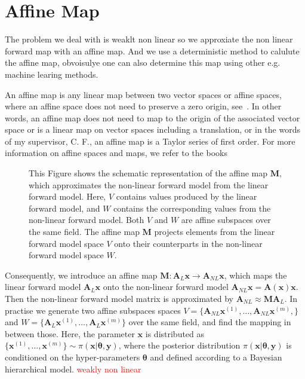 \section{Affine Map}
\label{sec:affine}
The problem we deal with is weaklt non linear so we approxiate the non linear forward map with an affine map.
And we use a deterministic method to calulute the affine map, obvoisulye one can also determine this map using other e.g. machine learing methods.



An affine map is any linear map between two vector spaces or affine spaces, where an affine space does not need to preserve a zero origin, see~\cite[Def. 2.3.1]{berger2009geometry}.
In other words, an affine map does not need to map to the origin of the associated vector space or is a linear map on vector spaces including a translation, or in the words of my supervisor, C. F., an affine map is a Taylor series of first order.
For more information on affine spaces and maps, we refer to the books \cite{berger2009geometry, katsumi1994affine}
\begin{figure}[ht!]
	\centering
	\caption[Schematics of the affine map]{This Figure shows the schematic representation of the affine map $\bm{M}$, which approximates the non-linear forward model from the linear forward model. Here, $V$ contains values produced by the linear forward model, and $W$ contains the corresponding values from the non-linear forward model. Both $V$ and $W$ are affine subspaces over the same field. The affine map $\bm{M}$ projects elements from the linear forward model space $V$ onto their counterparts in the non-linear forward model space $W$.
	}
\end{figure}

Consequently, we introduce an affine map $ \bm{M}:\bm{A}_L \bm{x} \rightarrow \bm{A}_{NL}\bm{x}$, which maps the linear forward model $\bm{A}_L \bm{x}$ onto the non-linear forward model $ \bm{A}_{NL} \bm{x} = \bm{A}(\bm{x})\bm{x} $.
Then the non-linear forward model matrix is approximated by $\bm{A}_{NL} \approx \bm{M} \bm{A}_L$.
In practise we generate two affine subspaces spaces $V = \big\{ \bm{A}_{NL}\bm{x}^{(1)}, \dots ,\bm{A}_{NL}\bm{x}^{(m)}, \big\} $ and $W = \big\{ \bm{A}_L\bm{x}^{(1)}, \dots ,\bm{A}_L\bm{x}^{(m)}\big\}$ over the same field, and find the mapping in between those.
Here, the parameter $\bm{x}$ is distributed as $\big\{  \bm{x}^{(1)} , \dots, \bm{x}^{(m)} \big\} \sim \pi(\bm{x}|\bm{\theta},\bm{y})$, where the posterior distribution $\pi(\bm{x}|\bm{\theta},\bm{y})$ is conditioned on the hyper-parameters $\bm{\theta}$ and defined according to a Bayesian hierarchical model.
\textcolor{red}{weakly non linear}

